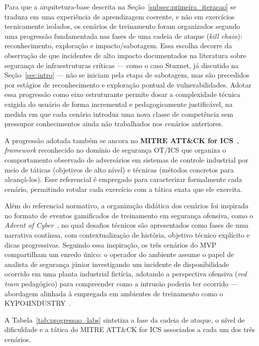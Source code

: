 \documentclass[conference]{IEEEtran}
\begin{document}
Para que a arquitetura-base descrita na Seção~\ref{subsec:primeira_iteracao} se traduza em uma experiência de aprendizagem coerente, e não em exercícios tecnicamente isolados, os cenários de treinamento foram organizados segundo uma progressão fundamentada nas fases de uma cadeia de ataque (\textit{kill chain}): reconhecimento, exploração e impacto/sabotagem. Essa escolha decorre da observação de que incidentes de alto impacto documentados na literatura sobre segurança de infraestruturas críticas --- como o caso Stuxnet, já discutido na Seção~\ref{sec:intro} --- não se iniciam pela etapa de sabotagem, mas são precedidos por estágios de reconhecimento e exploração pontual de vulnerabilidades. Adotar essa progressão como eixo estruturante permite dosar a complexidade técnica exigida do usuário de forma incremental e pedagogicamente justificável, na medida em que cada cenário introduz uma nova classe de competência sem pressupor conhecimentos ainda não trabalhados nos cenários anteriores.

A progressão adotada também se ancora no \textbf{MITRE ATT\&CK for ICS}~\cite{mitre_ics_techniques}, \textit{framework} reconhecido no domínio de segurança OT/ICS que organiza o comportamento observado de adversários em sistemas de controle industrial por meio de táticas (objetivos de alto nível) e técnicas (métodos concretos para alcançá-los). Esse referencial é empregado para caracterizar formalmente cada cenário, permitindo rotular cada exercício com a tática exata que ele exercita.

Além do referencial normativo, a organização didática dos cenários foi inspirada no formato de eventos gamificados de treinamento em segurança ofensiva, como o \textit{Advent of Cyber}~\cite{tryhackmeadventofcyber}, no qual desafios técnicos são apresentados como fases de uma narrativa contínua, com contextualização de história, objetivo técnico explícito e dicas progressivas. Seguindo essa inspiração, os três cenários do MVP compartilham um enredo único: o operador do ambiente assume o papel de analista de segurança júnior investigando um incidente de disponibilidade ocorrido em uma planta industrial fictícia, adotando a perspectiva ofensiva (\textit{red team} pedagógico) para compreender como a intrusão poderia ter ocorrido --- abordagem alinhada à empregada em ambientes de treinamento como o KYPO4INDUSTRY~\cite{celeda2020}.

A Tabela~\ref{tab:progressao_labs} sintetiza a fase da cadeia de ataque, o nível de dificuldade e a tática do MITRE ATT\&CK for ICS associados a cada um dos três cenários.
\end{document}
